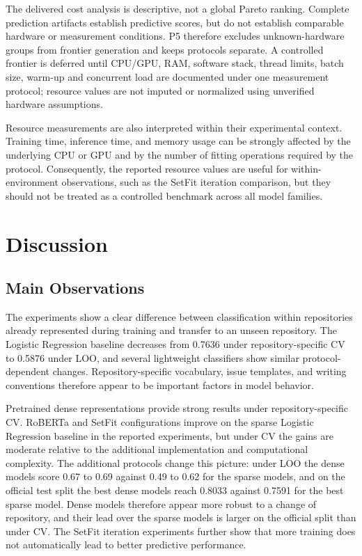 The delivered cost analysis is descriptive, not a global Pareto ranking. Complete prediction artifacts establish predictive scores, but do not establish comparable hardware or measurement conditions. P5 therefore excludes unknown-hardware groups from frontier generation and keeps protocols separate. A controlled frontier is deferred until CPU/GPU, RAM, software stack, thread limits, batch size, warm-up and concurrent load are documented under one measurement protocol; resource values are not imputed or normalized using unverified hardware assumptions.

Resource measurements are also interpreted within their experimental context. Training time, inference time, and memory usage can be strongly affected by the underlying CPU or GPU and by the number of fitting operations required by the protocol. Consequently, the reported resource values are useful for within-environment observations, such as the SetFit iteration comparison, but they should not be treated as a controlled benchmark across all model families.

\section{Discussion}
\subsection{Main Observations}
The experiments show a clear difference between classification within repositories already represented during training and transfer to an unseen repository. The Logistic Regression baseline decreases from 0.7636 under repository-specific CV to 0.5876 under LOO, and several lightweight classifiers show similar protocol-dependent changes. Repository-specific vocabulary, issue templates, and writing conventions therefore appear to be important factors in model behavior.

Pretrained dense representations provide strong results under repository-specific CV. RoBERTa and SetFit configurations improve on the sparse Logistic Regression baseline in the reported experiments, but under CV the gains are moderate relative to the additional implementation and computational complexity. The additional protocols change this picture: under LOO the dense models score 0.67 to 0.69 against 0.49 to 0.62 for the sparse models, and on the official test split the best dense models reach 0.8033 against 0.7591 for the best sparse model. Dense models therefore appear more robust to a change of repository, and their lead over the sparse models is larger on the official split than under CV. The SetFit iteration experiments further show that more training does not automatically lead to better predictive performance.


